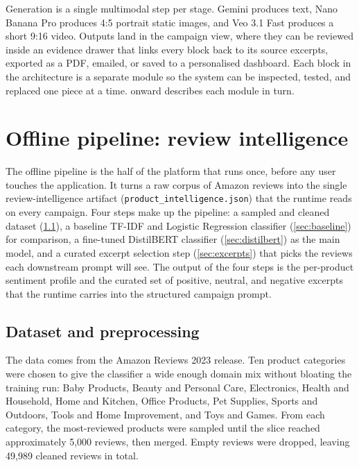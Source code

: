\documentclass[12pt,a4paper]{report}
\begin{document}
Generation is a single multimodal step per stage. Gemini produces text, Nano Banana Pro produces 4:5 portrait static images, and Veo 3.1 Fast produces a short 9:16 video. Outputs land in the campaign view, where they can be reviewed inside an evidence drawer that links every block back to its source excerpts, exported as a PDF, emailed, or saved to a personalised dashboard. Each block in the architecture is a separate module so the system can be inspected, tested, and replaced one piece at a time.  onward describes each module in turn.

\section{Offline pipeline: review intelligence}
\label{sec:offline}

The offline pipeline is the half of the platform that runs once, before any user touches the application. It turns a raw corpus of Amazon reviews into the single review-intelligence artifact (\texttt{product\_intelligence.json}) that the runtime reads on every campaign. Four steps make up the pipeline: a sampled and cleaned dataset (\cref{sec:dataset}), a baseline TF-IDF and Logistic Regression classifier (\cref{sec:baseline}) for comparison, a fine-tuned DistilBERT classifier (\cref{sec:distilbert}) as the main model, and a curated excerpt selection step (\cref{sec:excerpts}) that picks the reviews each downstream prompt will see. The output of the four steps is the per-product sentiment profile and the curated set of positive, neutral, and negative excerpts that the runtime carries into the structured campaign prompt.

\subsection{Dataset and preprocessing}
\label{sec:dataset}

The data comes from the Amazon Reviews 2023 release. Ten product categories were chosen to give the classifier a wide enough domain mix without bloating the training run: Baby Products, Beauty and Personal Care, Electronics, Health and Household, Home and Kitchen, Office Products, Pet Supplies, Sports and Outdoors, Tools and Home Improvement, and Toys and Games. From each category, the most-reviewed products were sampled until the slice reached approximately 5,000 reviews, then merged. Empty reviews were dropped, leaving 49,989 cleaned reviews in total.
\end{document}
